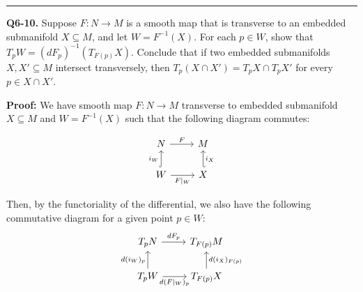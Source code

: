 \documentclass{article}
\newcommand{\restr}[2]{{%
  \left.\kern-\nulldelimiterspace %
  #1 %
  \vphantom{\big|} %
  \right|_{#2} %
  }}
\begin{document}
\vskip 0.25cm

\vskip 0.5cm
\hrule 
\vskip 0.5cm



\textbf{Q6-10.} Suppose $F : N \rightarrow M$ is a smooth map that is transverse to an embedded submanifold $X \subseteq M$, and let $W = F^{-1}(X)$. For each $p \in W$, show that $T_p W = \left(dF_p\right)^{-1} \left( T_{F(p)} X\right)$. Conclude that if two embedded submanifolds $X, X' \subseteq M$ intersect transversely, then $T_p \left(X \cap X'\right) = T_pX \cap T_pX'$ for every $p \in X \cap X'$.

\vskip 0.5cm
\textbf{Proof:}
We have smooth map $F : N \rightarrow M$ transverse to embedded submanifold $X \subseteq M$ and $W = F^{-1}(X)$ such that the following diagram commutes:

\[\begin{tikzcd}
	N & M \\
	W & X
	\arrow["F", from=1-1, to=1-2]
	\arrow["{F|_{W}}"', from=2-1, to=2-2]
	\arrow["{i_W}", hook, from=2-1, to=1-1]
	\arrow["{i_X}"', hook', from=2-2, to=1-2]
\end{tikzcd}\]

Then, by the functoriality of the differential, we also have the following commutative diagram for a given point $p \in W$:
\[\begin{tikzcd}
	{T_pN} & {T_{F(p)}M} \\
	{T_pW} & {T_{F(p)}X}
	\arrow["{dF_p}", from=1-1, to=1-2]
	\arrow["{d(F|_{W})_p}"', from=2-1, to=2-2]
	\arrow["{d(i_W)_p}", from=2-1, to=1-1]
	\arrow["{d(i_X)_{F(p)}}"', from=2-2, to=1-2]
\end{tikzcd}\]



\end{document}
